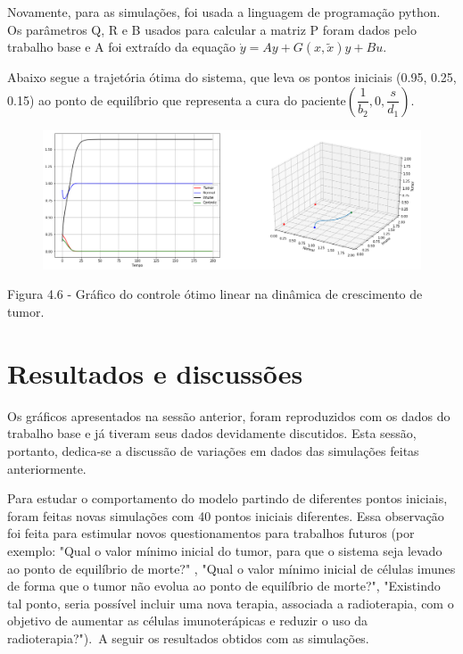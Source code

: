 \documentclass[12pt, a4paper]{article}
\begin{document}
Novamente, para as simulações, foi usada a linguagem de programação python.\\ 
Os parâmetros Q, R e B usados para calcular a matriz P foram dados pelo trabalho base e A foi extraído da equação $\dot y = Ay + G(x,\tilde{x})y + Bu$.

Abaixo segue a trajetória ótima do sistema, que leva os pontos iniciais (0.95, 0.25, 0.15) ao ponto de equilíbrio que representa a cura do paciente$(\dfrac{1}{b_2}, 0, \dfrac{s}{d_1})$.

\begin{center}
\begin{figure}[!h]
	\centering
    \includegraphics[scale=0.4]{imgs/plot_otm_1.png}

  \end{figure}


Figura 4.6 - Gráfico do controle ótimo linear na dinâmica de crescimento de tumor.
\end{center}


\newpage

\section{Resultados e discussões }

Os gráficos apresentados na sessão anterior, foram reproduzidos com os dados do trabalho base e já tiveram seus dados devidamente discutidos.
Esta sessão, portanto, dedica-se a discussão de variações em dados das simulações feitas anteriormente.\

Para estudar o comportamento do modelo partindo de diferentes pontos iniciais, foram feitas novas simulações com 40 pontos iniciais diferentes. Essa observação foi feita para estimular novos questionamentos para trabalhos futuros (por exemplo: "Qual o valor mínimo inicial do tumor, para que o sistema seja levado ao ponto de equilíbrio de morte?" , "Qual o valor mínimo inicial de células imunes de forma que o tumor não evolua ao ponto de equilíbrio de morte?", "Existindo tal ponto, seria possível incluir uma nova terapia, associada a radioterapia, com o objetivo de aumentar as células imunoterápicas e reduzir o uso da radioterapia?").\
A seguir os resultados obtidos com as simulações.
\end{document}
